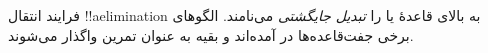 \documentclass[../../../include/open-logic-section]{subfiles}
\begin{document}
فرایند انتقال !!a{elimination} به بالای قاعدهٔ \Elim{\lor} یا
\Elim{\lexists} را \emph{تبدیل جایگشتی} می‌نامند. الگوهای برخی
جفت‌قاعده‌ها در  آمده‌اند و بقیه به
عنوان تمرین واگذار می‌شوند.

\end{document}
